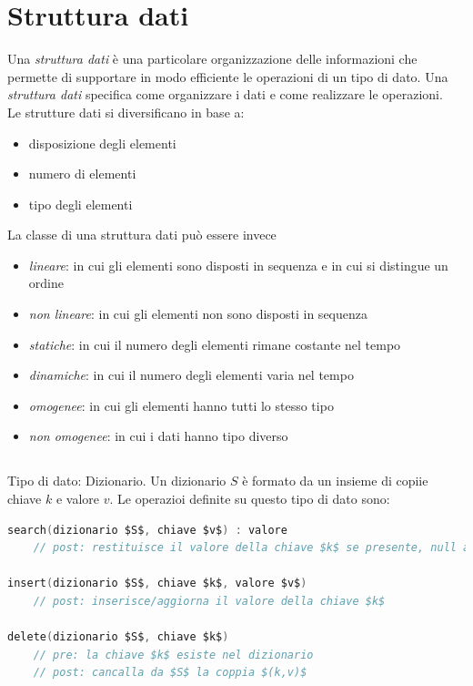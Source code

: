 \documentclass[italian]{article}
\newcommand{\example}{\text{\faCircleArrowRight $\;$ Esempio }}
\begin{document}
\section{Struttura dati}
Una \textit{struttura dati} è una particolare organizzazione delle informazioni che permette di supportare in modo efficiente le operazioni di un tipo di dato. Una \textit{struttura dati} specifica come organizzare i dati e come realizzare le operazioni.\\
Le strutture dati si diversificano in base a:
\begin{itemize}[itemsep=0pt]
	\item disposizione degli elementi
	\item numero di elementi
	\item tipo degli elementi
\end{itemize}
La classe di una struttura dati può essere invece
\begin{itemize}[itemsep=0pt]
	\item \textit{lineare}: in cui gli elementi sono disposti in sequenza e in cui si distingue un ordine
	\item \textit{non lineare}: in cui gli elementi non sono disposti in sequenza
	\item \textit{statiche}: in cui il numero degli elementi rimane costante nel tempo
	\item \textit{dinamiche}: in cui il numero degli elementi varia nel tempo
	\item \textit{omogenee}: in cui gli elementi hanno tutti lo stesso tipo
	\item \textit{non omogenee}: in cui i dati hanno tipo diverso
\end{itemize}
\pagebreak
\subsection{\example}
Tipo di dato: Dizionario. Un dizionario $S$ è formato da un insieme di copiie chiave $k$ e valore $v$. Le operazioi definite su questo tipo di dato sono:
\begin{lstlisting}[language=c,mathescape=true]
search(dizionario $S$, chiave $v$) : valore
	// post: restituisce il valore della chiave $k$ se presente, null altirmenti
	
insert(dizionario $S$, chiave $k$, valore $v$)
	// post: inserisce/aggiorna il valore della chiave $k$
	
delete(dizionario $S$, chiave $k$)
	// pre: la chiave $k$ esiste nel dizionario
	// post: cancalla da $S$ la coppia $(k,v)$
\end{lstlisting}
\end{document}
